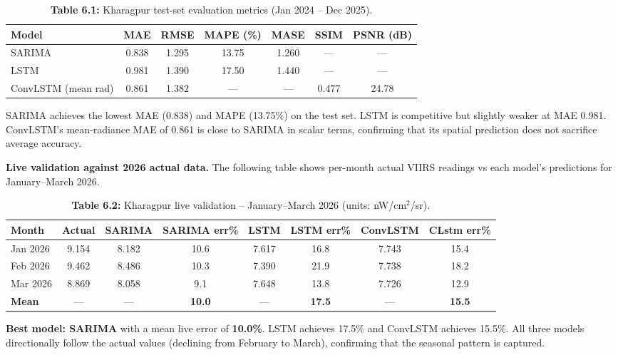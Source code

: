 \documentclass[12pt,a4paper]{report}
\begin{document}
\begin{table}[H]
\centering
\caption*{\textbf{Table 6.1:} Kharagpur test-set evaluation metrics (Jan 2024 -- Dec 2025).}
\begin{tabular}{lcccccc}
\toprule
\textbf{Model} & \textbf{MAE} & \textbf{RMSE} & \textbf{MAPE (\%)} & \textbf{MASE} & \textbf{SSIM} & \textbf{PSNR (dB)} \\
\midrule
SARIMA & 0.838 & 1.295 & 13.75 & 1.260 & --- & --- \\
LSTM   & 0.981 & 1.390 & 17.50 & 1.440 & --- & --- \\
ConvLSTM (mean rad) & 0.861 & 1.382 & --- & --- & 0.477 & 24.78 \\
\bottomrule
\end{tabular}
\end{table}

SARIMA achieves the lowest MAE (0.838) and MAPE (13.75\%) on the test set. LSTM is competitive but slightly weaker at MAE 0.981. ConvLSTM's mean-radiance MAE of 0.861 is close to SARIMA in scalar terms, confirming that its spatial prediction does not sacrifice average accuracy.

\textbf{Live validation against 2026 actual data.} The following table shows per-month actual VIIRS readings vs each model's predictions for January--March 2026.

\begin{table}[H]
\centering
\caption*{\textbf{Table 6.2:} Kharagpur live validation -- January--March 2026 (units: nW/cm$^2$/sr).}
\begin{tabular}{lccccccc}
\toprule
\textbf{Month} & \textbf{Actual} & \textbf{SARIMA} & \textbf{SARIMA err\%} & \textbf{LSTM} & \textbf{LSTM err\%} & \textbf{ConvLSTM} & \textbf{CLstm err\%} \\
\midrule
Jan 2026 & 9.154 & 8.182 & 10.6 & 7.617 & 16.8 & 7.743 & 15.4 \\
Feb 2026 & 9.462 & 8.486 & 10.3 & 7.390 & 21.9 & 7.738 & 18.2 \\
Mar 2026 & 8.869 & 8.058 & 9.1  & 7.648 & 13.8 & 7.726 & 12.9 \\
\midrule
\textbf{Mean} & --- & --- & \textbf{10.0} & --- & \textbf{17.5} & --- & \textbf{15.5} \\
\bottomrule
\end{tabular}
\end{table}

\textbf{Best model: SARIMA} with a mean live error of \textbf{10.0\%}. LSTM achieves 17.5\% and ConvLSTM achieves 15.5\%. All three models directionally follow the actual values (declining from February to March), confirming that the seasonal pattern is captured.
\end{document}
